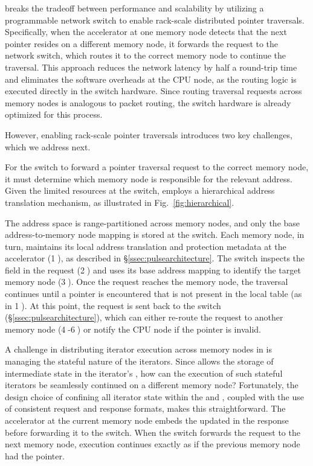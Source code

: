 \pulse breaks the tradeoff between performance and scalability by utilizing a programmable network switch to enable rack-scale distributed pointer traversals. Specifically, when the \pulse accelerator at one memory node detects that the next pointer resides on a different memory node, it forwards the request to the network switch, which routes it to the correct memory node to continue the traversal. This approach reduces the network latency by half a round-trip time and eliminates the software overheads at the CPU node, as the routing logic is executed directly in the switch hardware. Since routing traversal requests across memory nodes is analogous to packet routing, the switch hardware is already optimized for this process.

However, enabling rack-scale pointer traversals introduces two key challenges, which we address next.

 For the switch to forward a pointer traversal request to the correct memory node, it must determine which memory node is responsible for the relevant address. Given the limited resources at the switch, \pulse employs a hierarchical address translation mechanism, as illustrated in Fig.~\ref{fig:hierarchical}. 

The address space is range-partitioned across memory nodes, and only the base address-to-memory node mapping is stored at the switch. Each memory node, in turn, maintains its local address translation and protection metadata at the accelerator (\textcircled{1}), as described in \S\ref{ssec:pulsearchitecture}. The switch inspects the  field in the request (\textcircled{2}) and uses its base address mapping to identify the target memory node (\textcircled{3}). Once the request reaches the memory node, the traversal continues until a pointer is encountered that is not present in the local table (as in \textcircled{1}). At this point, the request is sent back to the switch (\S\ref{ssec:pulsearchitecture}), which can either re-route the request to another memory node (\textcircled{4}-\textcircled{6}) or notify the CPU node if the pointer is invalid.

 A challenge in distributing iterator execution across memory nodes in \pulse is managing the stateful nature of the iterators. Since \pulse allows the storage of intermediate state in the iterator's , how can the execution of such stateful iterators be seamlessly continued on a different memory node? Fortunately, the design choice of confining all iterator state within the  and , coupled with the use of consistent request and response formats, makes this straightforward. The accelerator at the current memory node embeds the updated  in the response before forwarding it to the switch. When the switch forwards the request to the next memory node, execution continues exactly as if the previous memory node had the pointer.





